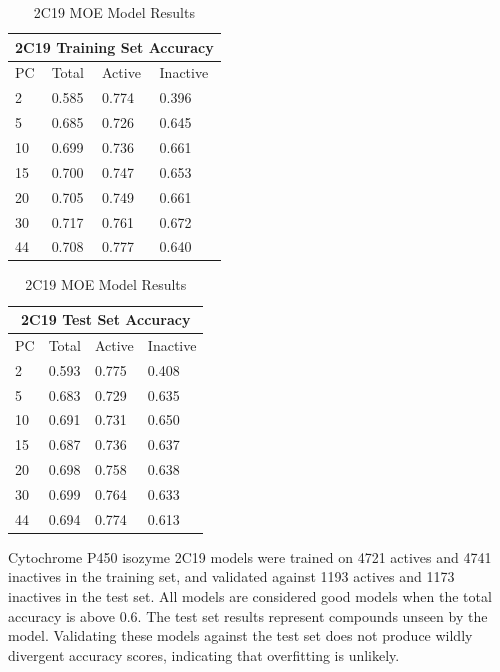 \begin{table}[H]
\caption{2C19 MOE Model Results}
\begin{minipage}{.5\linewidth}
\centering
\begin{tabular}{|l|l|l|l|}
\hline
\multicolumn{4}{|c|}{2C19 Training Set Accuracy} \\ \hline
PC & Total          & Active          & Inactive \\ \hline
2  & 0.585          & 0.774           & 0.396   \\ \hline
5  & 0.685          & 0.726           & 0.645   \\ \hline
10 & 0.699          & 0.736           & 0.661    \\ \hline
15 & 0.700          & 0.747           & 0.653    \\ \hline
20 & 0.705          & 0.749           & 0.661    \\ \hline
30 & 0.717          & 0.761           & 0.672    \\ \hline
44 & 0.708          & 0.777           & 0.640    \\ \hline
\end{tabular}
\end{minipage}%
\begin{minipage}{.5\linewidth}
\centering
\begin{tabular}{|l|l|l|l|}
\hline
\multicolumn{4}{|c|}{2C19 Test Set Accuracy}       \\ \hline
PC & Total          & Active          & Inactive   \\ \hline
2  & 0.593          & 0.775           & 0.408      \\ \hline
5  & 0.683          & 0.729           & 0.635      \\ \hline
10 & 0.691          & 0.731           & 0.650      \\ \hline
15 & 0.687          & 0.736           & 0.637      \\ \hline
20 & 0.698          & 0.758           & 0.638      \\ \hline
30 & 0.699          & 0.764           & 0.633      \\ \hline
44 & 0.694          & 0.774           & 0.613      \\ \hline
\end{tabular}
\end{minipage}
\end{table}

Cytochrome P450 isozyme 2C19 models were trained on 4721 actives and 4741 inactives in the training set, and validated against 1193 actives and 1173 inactives in the test set. All models are considered good models when the  total accuracy is above 0.6.  The test set results represent compounds unseen by the model. Validating these models against the test set does not produce wildly divergent accuracy scores, indicating that overfitting is unlikely. 


